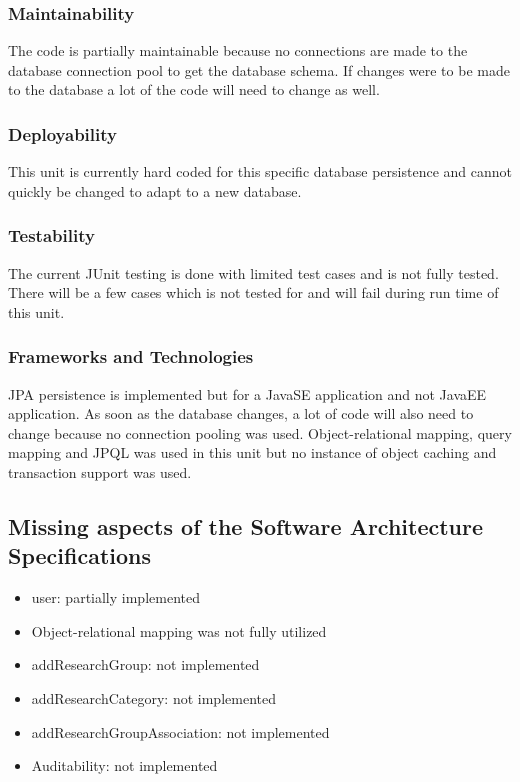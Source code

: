 \documentclass{article}
\begin{document}
\subsubsection{Maintainability}
The code is partially maintainable because no connections are made to the database connection pool to get the database schema. If changes were to be made to the database a lot of the code will need to change as well.

\subsubsection{Deployability}
This unit is currently hard coded for this specific database persistence and cannot quickly be changed to adapt to a new database.

\subsubsection{Testability}
The current JUnit testing is done with limited test cases and is not fully tested. There will be a few cases which is not tested for and will fail during run time of this unit.

\subsubsection{Frameworks and Technologies}
JPA persistence is implemented but for a JavaSE application and not JavaEE application. As soon as the database changes, a lot of code will also need to change because no connection pooling was used. Object-relational mapping, query mapping and JPQL was used in this unit but no instance of object caching and transaction support was used.

\subsection{Missing aspects of the Software Architecture Specifications}
\begin{itemize}
	\item user: partially implemented
	\item Object-relational mapping was not fully utilized
	\item addResearchGroup: not implemented
	\item addResearchCategory: not implemented
	\item addResearchGroupAssociation: not implemented
	\item Auditability: not implemented
\end{itemize}
\end{document}
